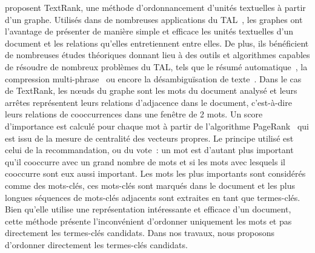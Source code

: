      proposent TextRank, une méthode
    d'ordonnancement d'unités textuelles à partir d'un graphe. Utilisés dans de
    nombreuses applications du TAL~\cite{kozareva2013textgraphs}, les graphes
    ont l'avantage de présenter de manière simple et efficace les unités
    textuelles d'un document et les relations qu'elles entretiennent entre
    elles. De plus, ils bénéficient de nombreuses études théoriques donnant lieu
    à des outils et algorithmes capables de résoudre de nombreux problèmes du
    TAL, tels que le résumé automatique~\cite{wan2007iterativereinforcement}, la
    compression multi-phrase~\cite{boudin2013multisentencecompression} ou encore
    la désambiguïsation de texte~\cite{schwab2013desambiguisation}. Dans le cas
    de TextRank, les n\oe{}uds du graphe sont les mots du document analysé et
    leurs arrêtes représentent leurs relations d'adjacence dans le document,
    c'est-à-dire leurs relations de cooccurrences dans une fenêtre de 2 mots.
    Un score d'importance est calculé pour chaque mot à partir de l'algorithme
    PageRank~\cite{brin1998pagerank} qui est issu de la mesure de centralité des
    vecteurs propres. Le principe utilisé est celui de la recommandation, ou du
    vote~: un mot est d'autant plus important qu'il cooccurre avec un grand
    nombre de mots et si les mots avec lesquels il cooccurre sont eux aussi
    important. Les mots les plus importants sont considérés comme des mots-clés,
    ces mots-clés sont marqués dans le document et les plus longues séquences de
    mots-clés adjacents sont extraites en tant que termes-clés. Bien qu'elle
    utilise une représentation intéressante et efficace d'un document, cette
    méthode présente l'inconvénient d'ordonner uniquement les mots et pas
    directement les termes-clés candidats. Dans nos travaux, nous proposons
    d'ordonner directement les termes-clés candidats.

